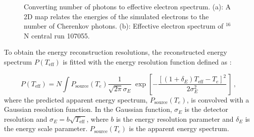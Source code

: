\begin{figure}[htbp]
	\centering
	\caption[Converting number of photons to effective electron spectrum.]{Converting number of photons to effective electron spectrum. (a): A 2D map relates the energies of the simulated electrons to the number of Cherenkov photons. (b): Effective electron spectrum of $^{16}$N central run 107055.\label{N16energyMap}}
\end{figure}

To obtain the energy reconstruction resolutions, the reconstructed energy spectrum $P(T_\mathrm{eff})$ is fitted with the energy resolution function defined as \cite{waterunidoc}:

\begin{equation}
P(T_\mathrm{eff})=N\int P_\mathrm{source}(T_e)\frac{1}{\sqrt{2\pi}\sigma_E} \; \exp \left[ -\frac{[(1+\delta_E)T_\mathrm{eff}-T_e]^2}{2\sigma_E^2} \, \right] \, ,
\end{equation}
where the predicted apparent energy spectrum, $P_\mathrm{source}(T_e)$, is convolved with a Gaussian resolution function. In the Gaussian function, $\sigma_E$ is the detector resolution and $\sigma_E = b\sqrt {T_\mathrm{eff}}$, where $b$ is the energy resolution parameter and $\delta_E$ is the energy scale parameter. $P_\mathrm{source}(T_e)$ is the apparent energy spectrum.

